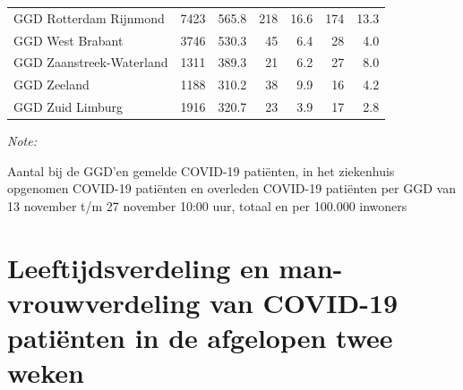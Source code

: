 \documentclass[
  english,
  man,floatsintext]{apa6}
\begin{document}
\begin{table}[H]
\begin{threeparttable}
\begin{tabular}{lrrrrrr}
GGD Rotterdam Rijnmond & 7423 & 565.8 & 218 & 16.6 & 174 & 13.3\\
GGD West Brabant & 3746 & 530.3 & 45 & 6.4 & 28 & 4.0\\
GGD Zaanstreek-Waterland & 1311 & 389.3 & 21 & 6.2 & 27 & 8.0\\
GGD Zeeland & 1188 & 310.2 & 38 & 9.9 & 16 & 4.2\\
GGD Zuid Limburg & 1916 & 320.7 & 23 & 3.9 & 17 & 2.8\\
\bottomrule
\end{tabular}
\begin{tablenotes}
\item \textit{Note: } 
\item Aantal bij de GGD’en gemelde COVID-19 patiënten, in het ziekenhuis opgenomen COVID-19 patiënten en overleden COVID-19 patiënten per GGD van 13 november t/m 27 november 10:00 uur, totaal en per 100.000 inwoners
\end{tablenotes}
\end{threeparttable}
\endgroup{}
\end{table}

\newpage

\hypertarget{leeftijdsverdeling-en-man-vrouwverdeling-van-covid-19-patiuxebnten-in-de-afgelopen-twee-weken}{%
\section{Leeftijdsverdeling en man-vrouwverdeling van COVID-19 patiënten in de afgelopen twee weken}\label{leeftijdsverdeling-en-man-vrouwverdeling-van-covid-19-patiuxebnten-in-de-afgelopen-twee-weken}}
\end{document}
